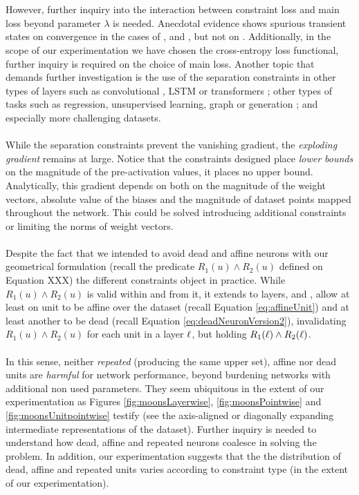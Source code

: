 \\\\
However, further inquiry into the interaction between constraint loss and main loss beyond parameter $\lambda$ is needed. Anecdotal evidence shows spurious transient states on convergence in the cases of \SepPoint, \SepUnit and \SepUnitPoint, but not on \SepLayer.  Additionally, in the scope of our experimentation we have chosen the cross-entropy loss functional, further inquiry is required on the choice of main loss. Another topic that demands further investigation is the use of the separation constraints in other types of layers such as convolutional \cite{lenet}, LSTM \cite{lstm} or transformers \cite{transformer}\cite{transformer2}; other types of tasks such as regression, unsupervised learning, \cite{embedding} graph \cite{graph} or generation \cite{gan}\cite{vae}; and especially more challenging datasets.
\\\\
While the separation constraints prevent the vanishing gradient, the \emph{exploding gradient} remains at large. Notice that the constraints designed place \emph{lower bounds} on the magnitude of the pre-activation values, it places no upper bound. Analytically, this gradient depends on both on the magnitude of the weight vectors, absolute value of the biases and  the magnitude of dataset points mapped throughout the network. This could be solved introducing additional constraints or limiting the norms of weight vectors. 
\\\\
Despite the fact that we intended to avoid dead and affine neurons with our geometrical formulation (recall the predicate $R_1(u) \wedge R_2(u)$ defined on Equation XXX) the different constraints  object in practice. While $R_1(u) \wedge R_2(u)$ is valid within \SepUnit and from it, it extends to layers, \SepLayer and \SepPoint,  allow at least on unit to be affine  over the dataset (recall Equation \ref{eq:affineUnit}) and at least another to be dead (recall Equation \ref{eq:deadNeuronVersion2}), invalidating $R_1(u) \wedge R_2(u)$ for each unit in a layer $\ell$, but holding $R_1(\ell) \wedge R_2(\ell)$. 
\\\\
In this sense, neither \emph{repeated} (producing the same upper set), affine nor dead units are \emph{harmful} for network performance, beyond burdening networks with additional non used parameters. They seem ubiquitous in the extent of our experimentation as Figures \ref{fig:moonsLayerwise}, \ref{fig:moonsPointwise} and \ref{fig:moonsUnitpointwise} testify (see the axis-aligned or diagonally expanding intermediate representations of the dataset). Further inquiry is needed to understand how dead, affine and repeated neurons coalesce in solving the problem. In addition, our experimentation suggests that the  the distribution of dead, affine and repeated units varies according to constraint type (in the extent of our experimentation). 
